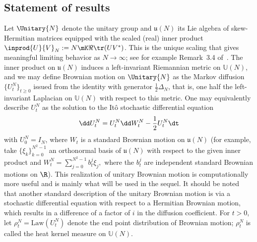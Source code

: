 \subsection*{Statement of results}

Let $\Unitary{N}$ denote the unitary group and $\mathfrak{u}(N)$ its Lie algebra of skew-Hermitian matrices equipped with the scaled (real) inner product $\inprod{U}{V}_N:=N\mK \Re\tr(UV^*)$. This is the unique scaling that gives meaningful limiting behavior as $N\rightarrow\infty$; see for example Remark~3.4 of~\cite{DHK2013}. The inner product on $\mathfrak{u}(N)$ induces a left-invariant Riemannian metric on $\mathbb{U}(N)$, and we may define Brownian motion on $\Unitary{N}$ as the Markov diffusion $\{U^N_t\}_{t\ge0}$ issued from the identity with generator $\frac{1}{2}\Delta_{N}$, that is, one half the left-invariant Laplacian on $\mathbb{U}(N)$ with respect to this metric. One may equivalently describe $U^N_t$ as the solution to the It\^o stochastic differential equation
\begin{equation*}
\dd U^N_t=U^{N}_t\dd W^N_t-\frac{1}{2}U^{N}_t\dt
\end{equation*}
with $U^N_0=I_N$, where $W_t$ is a standard Brownian motion on $\mathfrak{u}(N)$ (for example, take $\{\xi_k\}_{k=0}^{N^2-1}$ an orthonormal basis of $\mathfrak{u}(N)$ with respect to the given inner product and $W^N_t=\sum_{j=0}^{N^2-1}b^j_t\xi_j,$ where the $b^j_t$ are independent standard Brownian motions on $\R$). This realization of unitary Brownian motion is computationally more useful and is mainly what will be used in the sequel. It should be noted that another standard description of the unitary Brownian motion is via a stochastic differential equation with respect to a Hermitian Brownian motion, which results in a difference of a factor of $i$ in the diffusion coefficient. For $t>0$, let $\rho^N_t=\mathrm{Law}(U^N_t)$ denote the end point distribution of Brownian motion; $\rho^N_t$ is called the heat kernel measure on $\mathbb{U}(N)$.

